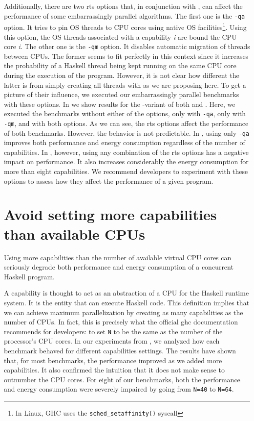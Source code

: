 Additionally, there are two \ac{rts} options that, in conjunction with \forkOn, can affect the performance of some embarrassingly parallel algorithms. The first one is the \texttt{-qa} option. It tries to pin OS threads to CPU cores using native OS facilities\footnote{In Linux, GHC uses the \texttt{sched\_setaffinity()} syscall}. Using this option, the OS threads associated with a capability \emph{i} are bound the CPU core \emph{i}. The other one is the \texttt{-qm} option. It disables automatic migration of threads between CPUs. The former seems to fit perfectly in this context since it increases the probability of a Haskell thread being kept running on the same CPU core during the execution of the program. However, it is not clear how different the latter is from simply creating all threads with \forkOn as we are proposing here. To get a picture of their influence, we executed our embarrassingly parallel benchmarks with these options. In  we show results for the \forkOn-\MVar variant of both \regex and \spectral. Here, we executed the benchmarks without either of the options, only with \texttt{-qa}, only with \texttt{-qm}, and with both options. As we can see, the \ac{rts} options affect the performance of both benchmarks. However, the behavior is not predictable. In \spectral, using only \texttt{-qa} improves both performance and energy consumption regardless of the number of capabilities. In \regex, however, using any combination of the \ac{rts} options has a negative impact on performance. It also increases considerably the energy consumption for more than eight capabilities. We recommend developers to experiment with these options to assess how they affect the performance of a given program.

\section{Avoid setting more capabilities than available CPUs}
 Using more capabilities than the number of available virtual CPU cores can seriously degrade both performance and energy consumption of a concurrent Haskell program.
\newline

 A capability is thought to act as an abstraction of a CPU for the Haskell runtime system. It is the entity that can execute Haskell code. This definition implies that we can achieve maximum parallelization by creating as many capabilities as the number of CPUs. In fact, this is precisely what the official \ac{ghc} documentation recommends for developers: to set \texttt{N} to be the same as the number of the processor's CPU cores. In our experiments from , we analyzed how each benchmark behaved for different capabilities settings. The results have shown that, for most benchmarks, the performance improved as we added more capabilities. It also confirmed the intuition that it does not make sense to outnumber the CPU cores. For eight of our benchmarks, both the performance and energy consumption were severely impaired by going from \texttt{N=40} to \texttt{N=64}.

